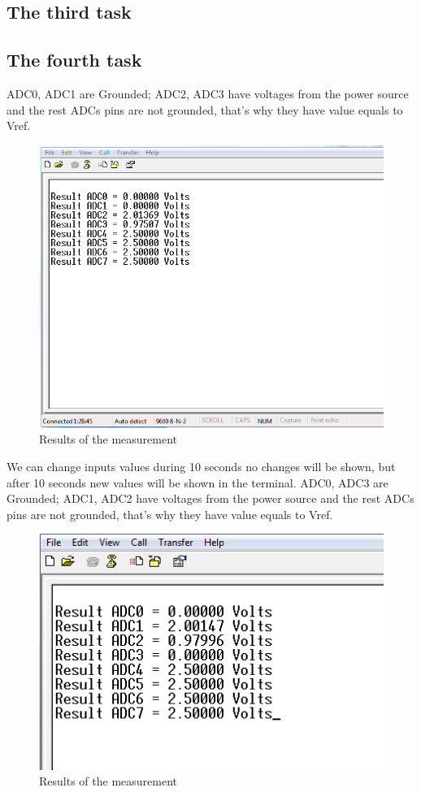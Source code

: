 \documentclass[english]{article}
\begin{document}
\subsection{The third task}


\subsection{The fourth task}


ADC0, ADC1 are Grounded; ADC2, ADC3 have voltages from the power source and the rest ADCs pins are not grounded, that’s why they have value equals to Vref.
\begin{figure}[H]
\centerline{\includegraphics[scale=0.8]{MicroLab8/1r}}
\caption{Results of the measurement}
\end{figure}
We can change inputs values during 10 seconds no changes will be shown, but after 10 seconds new values will be shown in the terminal. ADC0, ADC3 are Grounded; ADC1, ADC2 have voltages from the power source and the rest ADCs pins are not grounded, that’s why they have value equals to Vref.
\begin{figure}[H]
\centerline{\includegraphics[scale=0.8]{MicroLab8/2r}}
\caption{Results of the measurement}
\end{figure}
\end{document}
